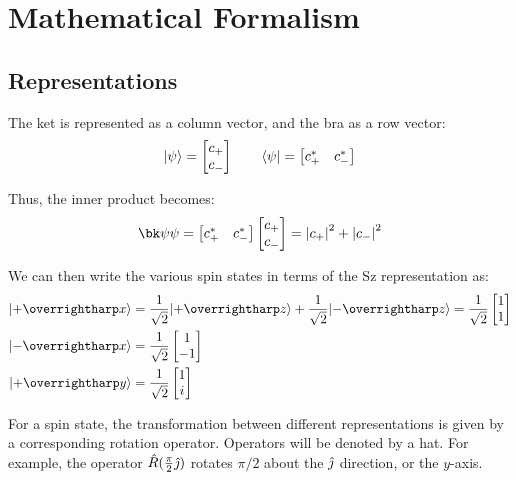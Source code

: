 \chapter{Mathematical Formalism}
\section{Representations}
The ket is represented as a column vector, and the bra as a row vector:
\begin{equation}
	\k\p = \begin{bmatrix}c_+\\c_-\end{bmatrix}\qquad \b\p = \begin{bmatrix}c_+\ast & c_-\ast\end{bmatrix}\label{eq2:rep} 
\end{equation}

Thus, the inner product becomes:
\begin{equation}
	\bk\p\p=\begin{bmatrix}c_+\ast & c_-\ast\end{bmatrix}\begin{bmatrix}c_+ \\ c_-\end{bmatrix} = \abs{c_+}^2+\abs{c_-}^2
\end{equation}

We can then write the various spin states  in terms of the Sz representation as:
\begin{align*}
	\k{+\vv x}&=\frac{1}{\sqrt{2}}\k{+\vv{z}}+\frac{1}{\sqrt{2}}\k{-\vv{z}}=\frac{1}{\sqrt{2}}\begin{bmatrix}1\\1\end{bmatrix}\\
	\k{-\vv{x}}&=\frac{1}{\sqrt{2}}\begin{bmatrix}1\\-1\end{bmatrix}\\
		\k{+\vv y}&=\frac{1}{\sqrt{2}}\begin{bmatrix}1\\i\end{bmatrix}
\end{align*}

For a spin state, the transformation between different representations is given by a corresponding rotation operator. Operators will be denoted by a hat. For example, the operator \(\hat R (\frac{\pi}{2} \hat{\jmath})\) rotates \(\pi/2\) about the \(\hat{\jmath}\) direction, or the \(y\)-axis.

